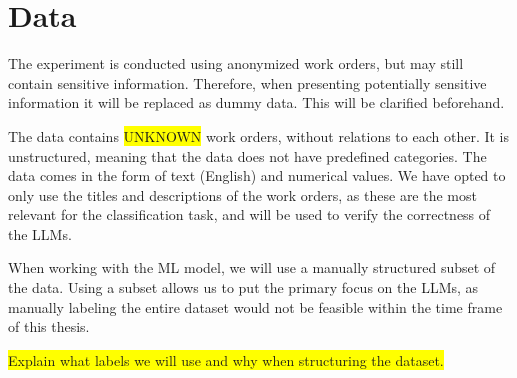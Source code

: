 \section{Data}

The experiment is conducted using anonymized work orders, but may still contain
sensitive information.
Therefore, when presenting potentially sensitive information it will be replaced
as dummy data.
This will be clarified beforehand.

The data contains \colorbox{yellow}{UNKNOWN} work orders, without relations
to each other.
It is unstructured, meaning that the data does not have predefined categories.
The data comes in the form of text (English) and numerical values.
We have opted to only use the titles and descriptions of the work orders,
as these are the most relevant for the classification task, and will be used to
verify the correctness of the LLMs.

When working with the ML model, we will use a manually structured subset of the
data.
Using a subset allows us to put the primary focus on the LLMs, as manually
labeling the entire dataset would not be feasible within the time frame of this
thesis.

\colorbox{yellow}{Explain what labels we will use and why when structuring the
    dataset.}
